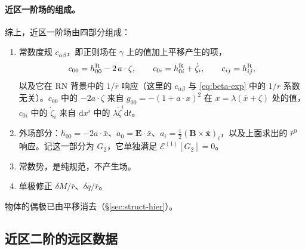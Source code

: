 \documentclass[11pt,a4paper]{ctexart}
\newcommand{\dd}{\mathrm d}
\begin{document}
\paragraph{近区一阶场的组成。}综上，近区一阶场由四部分组成：
\begin{enumerate}[nosep]
\item 常数度规 $c_{\alpha\beta}$，即正则场在 $\gamma$ 上的值加上平移产生的项，
\begin{equation}
c_{00}=h^{\rm R}_{00}-2\,a\cdot\zeta,\qquad c_{0i}=h^{\rm R}_{0i}+\dot\zeta_i,\qquad c_{ij}=h^{\rm R}_{ij},
\label{eq:cconst}
\end{equation}
以及它在 RN 背景中的 $1/\bar r$ 响应（这里的 $c_{\alpha\beta}$ 与 \eqref{eq:beta-exp} 中的 $1/r$ 系数无关）。$c_{00}$ 中的 $-2a\cdot\zeta$ 来自 $g_{00}=-(1+a\cdot x)^2$ 在 $x=\lambda(\bar x+\zeta)$ 处的值，$c_{0i}$ 中的 $\dot\zeta_i$ 来自 $\dd x^i$ 中的 $\lambda\dot\zeta^i\dd t$。
\item 外场部分：$h_{00}=-2a\cdot\bar x$、$a_0=\boldsymbol E\cdot\bar x$、$a_i=\tfrac12(\boldsymbol B\times\bar{\boldsymbol x})_i$，以及上面求出的 $\bar r^0$ 响应。记这一部分为 $G_2$，它单独满足 $\mathcal E^{(1)}[G_2]=0$。
\item 常数势，是纯规范，不产生场。
\item 单极修正 $\delta M/\bar r$、$\delta q/\bar r$。
\end{enumerate}
物体的偶极已由平移消去（\S\ref{sec:struct-hier}）。

\subsection{近区二阶的远区数据}\label{sec:first-data}
\end{document}
